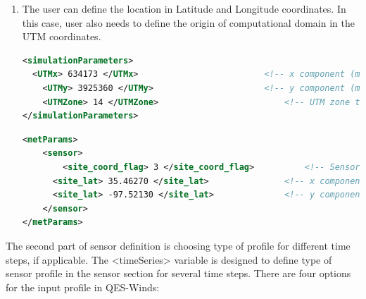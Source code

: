 \begin{enumerate}
\begin{lstlisting}[language=XML]
<metParams>
	<sensor>
	    <site_coord_flag> 2 </site_coord_flag> 			<!-- Sensor site coordinate system (1=QES (default), 2=UTM, 3=Lat/Lon) -->
      <site_UTM_x> 634175 </site_UTM_x> 				<!-- x components of site coordinate in UTM (if site_coord_flag = 2) -->
      <site_UTM_y> 3925362 </site_UTM_y> 				<!-- y components of site coordinate in UTM (if site_coord_flag = 2)-->
      <site_UTM_zone> 14 </site_UTM_zone> 				<!-- UTM zone of the sensor site (if site_coord_flag = 2)-->
	</sensor>
</metParams>
\end{lstlisting}
\noindent
\item The user can define the location in Latitude and Longitude coordinates. In this case, user also needs to define the origin of computational domain in the UTM coordinates.

\begin{lstlisting}[language=XML]
<simulationParameters>
  <UTMx> 634173 </UTMx> 						<!-- x component (m) of origin in UTM -->
	<UTMy> 3925360 </UTMy> 						<!-- y component (m) of origin in UTM -->
	<UTMZone> 14 </UTMZone> 						<!-- UTM zone that domain located -->
</simulationParameters>
\end{lstlisting}

\begin{lstlisting}[language=XML]
<metParams>
	<sensor>
	    <site_coord_flag> 3 </site_coord_flag> 			<!-- Sensor site coordinate system (1=QES (default), 2=UTM, 3=Lat/Lon) -->
      <site_lat> 35.46270 </site_lat> 				<!-- x components of site coordinate in Latitude (if site_coord_flag = 3) -->
      <site_lat> -97.52130 </site_lat> 				<!-- y components of site coordinate in Longitude (if site_coord_flag = 3)-->
	</sensor>
</metParams>
\end{lstlisting}

\end{enumerate}

The second part of sensor definition is choosing type of profile for different time steps, if applicable. The <timeSeries> variable is designed to define type of sensor profile in the sensor section for several time steps. There are four options for the input profile in QES-Winds:

